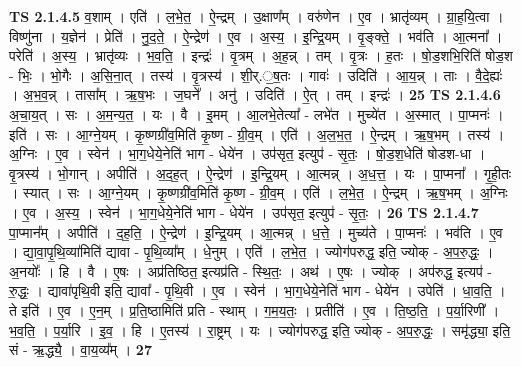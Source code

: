 \documentclass[17pt]{extarticle}
\begin{document}
                  \newline
                                \textbf{ TS 2.1.4.5} \newline
                  व॒शाम् । एति॑ । ल॒भे॒त॒ । ऐ॒न्द्रम् । उ॒क्षाण᳚म् । वरु॑णेन । ए॒व । भ्रातृ॑व्यम् । ग्रा॒ह॒यि॒त्वा । विष्णु॑ना । य॒ज्ञेन॑ । प्रेति॑ । नु॒द॒ते॒ । ऐ॒न्द्रेण॑ । ए॒व । अ॒स्य॒ । इ॒न्द्रि॒यम् । वृ॒ङ्क्ते॒ । भव॑ति । आ॒त्मना᳚ । परेति॑ । अ॒स्य॒ । भ्रातृ॑व्यः । भ॒व॒ति॒ । इन्द्रः॑ । वृ॒त्रम् । अ॒ह॒न्न् । तम् । वृ॒त्रः । ह॒तः । षो॒ड॒शभि॒रिति॑ षोड॒श - भिः॒ । भो॒गैः । अ॒सि॒ना॒त् । तस्य॑ । वृ॒त्रस्य॑ । शी॒र्.॒ष॒तः । गावः॑ । उदिति॑ । आ॒य॒न्न् । ताः । वै॒दे॒ह्यः॑ । अ॒भ॒व॒न्न् । तासा᳚म् । ऋ॒ष॒भः । ज॒घने᳚ । अनु॑ । उदिति॑ । ऐ॒त् । तम् । इन्द्रः॑ । \textbf{  25} \newline
                  \newline
                                \textbf{ TS 2.1.4.6} \newline
                  अ॒चा॒य॒त् । सः । अ॒म॒न्य॒त॒ । यः । वै । इ॒मम् । आ॒लभे॒तेत्या᳚ - लभे॑त । मुच्ये॑त । अ॒स्मात् । पा॒प्मनः॑ । इति॑ । सः । आ॒ग्ने॒यम् । कृ॒ष्णग्री॑व॒मिति॑ कृ॒ष्ण - ग्री॒व॒म् । एति॑ । अ॒ल॒भ॒त॒ । ऐ॒न्द्रम् । ऋ॒ष॒भम् । तस्य॑ । अ॒ग्निः । ए॒व । स्वेन॑ । भा॒ग॒धेये॒नेति॑ भाग - धेये॑न । उप॑सृत॒ इत्युप॑ - सृ॒तः॒ । षो॒ड॒श॒धेति॑ षोडश-धा । वृ॒त्रस्य॑ । भो॒गान् । अपीति॑ । अ॒द॒ह॒त् । ऐ॒न्द्रेण॑ । इ॒न्द्रि॒यम् । आ॒त्मन्न् । अ॒ध॒त्त॒ । यः । पा॒प्मना᳚ । गृ॒ही॒तः । स्यात् । सः । आ॒ग्ने॒यम् । कृ॒ष्णग्री॑व॒मिति॑ कृ॒ष्ण - ग्री॒व॒म् । एति॑ । ल॒भे॒त॒ । ऐ॒न्द्रम् । ऋ॒ष॒भम् । अ॒ग्निः । ए॒व । अ॒स्य॒ । स्वेन॑ । भा॒ग॒धेये॒नेति॑ भाग - धेये॑न । उप॑सृत॒ इत्युप॑ - सृ॒तः॒ । \textbf{  26} \newline
                  \newline
                                \textbf{ TS 2.1.4.7} \newline
                  पा॒प्मान᳚म् । अपीति॑ । द॒ह॒ति॒ । ऐ॒न्द्रेण॑ । इ॒न्द्रि॒यम् । आ॒त्मन्न् । ध॒त्ते॒ । मुच्य॑ते । पा॒प्मनः॑ । भव॑ति । ए॒व । द्या॒वा॒पृ॒थि॒व्या॑मिति॑ द्यावा - पृ॒थि॒व्या᳚म् । धे॒नुम् । एति॑ । ल॒भे॒त॒ । ज्योग॑परुद्ध॒ इति॒ ज्योक् - अ॒प॒रु॒द्धः॒ । अ॒नयोः᳚ । हि । वै । ए॒षः । अप्र॑तिष्ठित॒ इत्यप्र॑ति - स्थि॒तः॒ । अथ॑ । ए॒षः । ज्योक् । अप॑रुद्ध॒ इत्यप॑ - रु॒द्धः॒ । द्यावा॑पृथि॒वी इति॒ द्यावा᳚ - पृ॒थि॒वी । ए॒व । स्वेन॑ । भा॒ग॒धेये॒नेति॑ भाग - धेये॑न । उपेति॑ । धा॒व॒ति॒ । ते इति॑ । ए॒व । ए॒न॒म् । प्र॒ति॒ष्ठामिति॑ प्रति - स्थाम् । ग॒म॒य॒तः॒ । प्रतीति॑ । ए॒व । ति॒ष्ठ॒ति॒ । प॒र्या॒रिणी᳚ । भ॒व॒ति॒ । प॒र्या॒रि । इ॒व॒ । हि । ए॒तस्य॑ । रा॒ष्ट्रम् । यः । ज्योग॑परुद्ध॒ इति॒ ज्योक् - अ॒प॒रु॒द्धः॒ । समृ॑द्ध्या॒ इति॒ सं - ऋ॒द्ध्यै॒ । वा॒य॒व्य᳚म् । \textbf{  27} \newline
\end{document}
